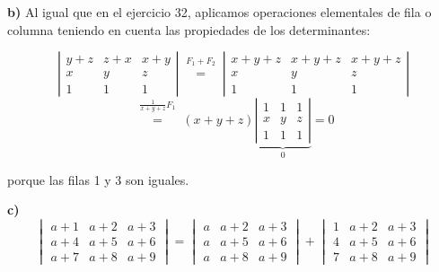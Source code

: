 \documentclass[a4paper,12pt]{article}
\begin{document}
\begin{ejercicio}[title=Ejercicio 33]
\vspace{0.5em}

\textbf{b)}
Al igual que en el ejercicio 32, aplicamos operaciones elementales de fila o columna teniendo en cuenta las propiedades de los determinantes:

\[
\left|
\begin{matrix}
y+z & z+x & x+y \\
x & y & z \\
1 & 1 & 1
\end{matrix}
\right|
\overset{\substack{F_1+F_2\\{}}}{=}
\left|
\begin{matrix}
x+y+z & x+y+z & x+y+z \\
x & y & z \\
1 & 1 & 1
\end{matrix}
\right|
\]
\[
\overset{\substack{\frac{1}{x+y+z}F_1\\{}}}{=}
(x+y+z)
\underbrace{
\left|
\begin{matrix}
1 & 1 & 1 \\
x & y & z \\
1 & 1 & 1
\end{matrix}
\right|
}_{0}
= \boxed{0}
\]

porque las filas 1 y 3 son iguales.

\vspace{0.5em}

\textbf{c)}  
\[
\begin{vmatrix}
a+1 & a+2 & a+3\\
a+4 & a+5 & a+6\\
a+7 & a+8 & a+9
\end{vmatrix}
=
\begin{vmatrix}
a & a+2 & a+3\\
a & a+5 & a+6\\
a & a+8 & a+9
\end{vmatrix}
+
\begin{vmatrix}
1 & a+2 & a+3\\
4 & a+5 & a+6\\
7 & a+8 & a+9
\end{vmatrix}
\]


\end{ejercicio}
\end{document}
